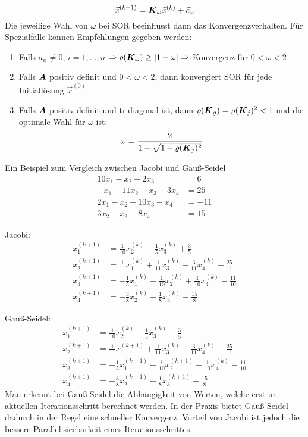 \begin{enumerate}
	\[\vec{x}^{(k + 1)} = \boldsymbol {K}_\omega \vec{x}^{(k)} + \vec{c}_\omega\]
	Die jeweilige Wahl von $\omega$ bei SOR beeinflusst dann das Konvergenzverhalten. Für Spezialfälle können Empfehlungen gegeben werden:
	\begin{enumerate}
		\item Falls $a_{ii} \ne 0$, $i = 1, \dots, n$ $\Rightarrow \varrho(\boldsymbol {K}_\omega) \ge |1 - \omega| \Rightarrow$ Konvergenz für $0 < \omega < 2$
		\item Falls $\boldsymbol {A}$ positiv definit und $0 < \omega < 2$, dann konvergiert SOR für jede Initiallösung $\vec{x}^{(0)}$
		\item Falls $\boldsymbol {A}$ positiv definit und tridiagonal ist, dann $\varrho(\boldsymbol {K}_g) = \varrho(\boldsymbol {K}_j)^2 < 1$ und die optimale Wahl für $\omega$ ist:
		\[\omega = \frac{2}{1 + \sqrt{1 - \varrho(\boldsymbol {K}_j)^2}}\]
	\end{enumerate}
\end{enumerate}
Ein Beispiel zum Vergleich zwischen Jacobi und Gauß-Seidel
\begin{align}
10 x_1 - x_2 + 2 x_3 &= 6 \\
- x_1 + 11 x_2 - x_3 + 3 x_4 &= 25 \\
2 x_1 - x_2 + 10 x_3 - x_4 &= -11 \\
3 x_2 - x_3 + 8 x_4 &= 15
\end{align}

Jacobi:
\begin{align}
	x_1^{(k + 1)} &= \frac{1}{10} x_2^{(k)} - \frac{1}{5} x_3^{(k)} + \frac{3}{5} \\
	x_2^{(k + 1)} &= \frac{1}{11} x_1^{(k)} + \frac{1}{11} x_3^{(k)} - \frac{3}{11} x_4^{(k)} + \frac{25}{11} \\
	x_3^{(k + 1)} &=  -\frac{1}{5} x_1^{(k)} + \frac{1}{10} x_2^{(k)} + \frac{1}{10} x_4^{(k)} - \frac{11}{10} \\
	x_4^{(k + 1)} &= -\frac{3}{8} x_2^{(k)} + \frac{1}{8} x_3^{(k)} + \frac{15}{8}
\end{align}

Gauß-Seidel:
\begin{align}
x_1^{(k + 1)} &= \frac{1}{10} x_2^{(k)} - \frac{1}{5} x_3^{(k)} + \frac{3}{5} \\
x_2^{(k + 1)} &= \frac{1}{11} x_1^{(k + 1)} + \frac{1}{11} x_3^{(k)} - \frac{3}{11} x_4^{(k)} + \frac{25}{11} \\
x_3^{(k + 1)} &= -\frac{1}{5} x_1^{(k + 1)} + \frac{1}{10} x_2^{(k + 1)} + \frac{1}{10} x_4^{(k)} - \frac{11}{10} \\
x_4^{(k + 1)} &= -\frac{3}{8} x_2^{(k + 1)} + \frac{1}{8} x_3^{(k + 1)} + \frac{15}{8}
\end{align}
Man erkennt bei Gauß-Seidel die Abhängigkeit von Werten, welche erst im aktuellen Iterationsschritt berechnet werden. In der Praxis bietet Gauß-Seidel dadurch in der Regel eine schneller Konvergenz. Vorteil von Jacobi ist jedoch die bessere Parallelisierbarkeit eines Iterationsschrittes.

